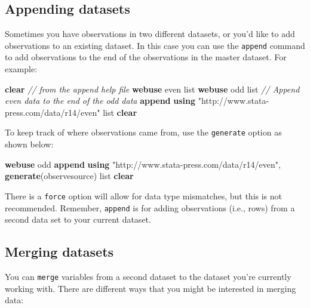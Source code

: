 \documentclass[
]{book}
\newenvironment{Shaded}{\begin{snugshade}}{\end{snugshade}}
\newcommand{\CommentTok}[1]{\textcolor[rgb]{0.56,0.35,0.01}{\textit{#1}}}
\newcommand{\KeywordTok}[1]{\textcolor[rgb]{0.13,0.29,0.53}{\textbf{#1}}}
\newcommand{\NormalTok}[1]{#1}
\newcommand{\OtherTok}[1]{\textcolor[rgb]{0.56,0.35,0.01}{#1}}
\newcommand{\StringTok}[1]{\textcolor[rgb]{0.31,0.60,0.02}{#1}}
\begin{document}
\hypertarget{appending-datasets}{%
\subsection{Appending datasets}\label{appending-datasets}}

Sometimes you have observations in two different datasets, or you'd like to add observations to an existing dataset. In this case you can use the \texttt{append} command to add observations to the end of the observations in the master dataset. For example:

\begin{Shaded}
\begin{Highlighting}[]
\KeywordTok{clear}
\CommentTok{// from the append help file}
\KeywordTok{webuse}\NormalTok{ even}
\OtherTok{list}
\KeywordTok{webuse}\NormalTok{ odd}
\OtherTok{list}
\CommentTok{// Append even data to the end of the odd data}
\KeywordTok{append} \KeywordTok{using} \StringTok{"http://www.stata{-}press.com/data/r14/even"}
\OtherTok{list}
\KeywordTok{clear}
\end{Highlighting}
\end{Shaded}

To keep track of where observations came from, use the \texttt{generate} option as shown below:

\begin{Shaded}
\begin{Highlighting}[]
\KeywordTok{webuse}\NormalTok{ odd}
\KeywordTok{append} \KeywordTok{using} \StringTok{"http://www.stata{-}press.com/data/r14/even"}\NormalTok{, }\KeywordTok{generate}\NormalTok{(observesource)}
\OtherTok{list}
\KeywordTok{clear}
\end{Highlighting}
\end{Shaded}

There is a \texttt{force} option will allow for data type mismatches, but this is not recommended. Remember, \texttt{append} is for adding observations (i.e., rows) from a second data set to your current dataset.

\hypertarget{merging-datasets}{%
\subsection{Merging datasets}\label{merging-datasets}}

You can \texttt{merge} variables from a second dataset to the dataset you're currently working with. There are different ways that you might be interested in merging data:
\end{document}
